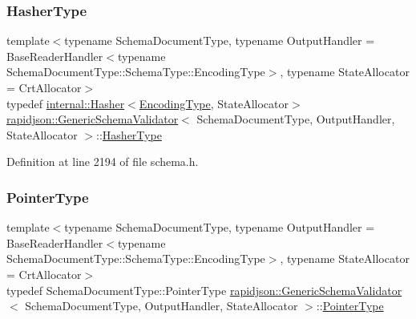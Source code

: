 \subsubsection{\texorpdfstring{HasherType}{HasherType}}
{\footnotesize\ttfamily template$<$typename Schema\+Document\+Type, typename Output\+Handler = Base\+Reader\+Handler$<$typename Schema\+Document\+Type\+::\+Schema\+Type\+::\+Encoding\+Type$>$, typename State\+Allocator = Crt\+Allocator$>$ \\
typedef \mbox{\hyperlink{classrapidjson_1_1internal_1_1_hasher}{internal\+::\+Hasher}}$<$\mbox{\hyperlink{classrapidjson_1_1_generic_schema_validator_abaea0f74722261f6dde0db65594efdfe}{Encoding\+Type}}, State\+Allocator$>$ \mbox{\hyperlink{classrapidjson_1_1_generic_schema_validator}{rapidjson\+::\+Generic\+Schema\+Validator}}$<$ Schema\+Document\+Type, Output\+Handler, State\+Allocator $>$\+::\mbox{\hyperlink{classrapidjson_1_1_generic_schema_validator_a5a038fcb26421e86937c6058ebc3e774}{Hasher\+Type}}\hspace{0.3cm}{\ttfamily [private]}}



Definition at line 2194 of file schema.\+h.

\mbox{\label{classrapidjson_1_1_generic_schema_validator_aace9622f8ebac1c386081f6d1dcd774e}} 
\subsubsection{\texorpdfstring{PointerType}{PointerType}}
{\footnotesize\ttfamily template$<$typename Schema\+Document\+Type, typename Output\+Handler = Base\+Reader\+Handler$<$typename Schema\+Document\+Type\+::\+Schema\+Type\+::\+Encoding\+Type$>$, typename State\+Allocator = Crt\+Allocator$>$ \\
typedef Schema\+Document\+Type\+::\+Pointer\+Type \mbox{\hyperlink{classrapidjson_1_1_generic_schema_validator}{rapidjson\+::\+Generic\+Schema\+Validator}}$<$ Schema\+Document\+Type, Output\+Handler, State\+Allocator $>$\+::\mbox{\hyperlink{classrapidjson_1_1_generic_schema_validator_aace9622f8ebac1c386081f6d1dcd774e}{Pointer\+Type}}}



